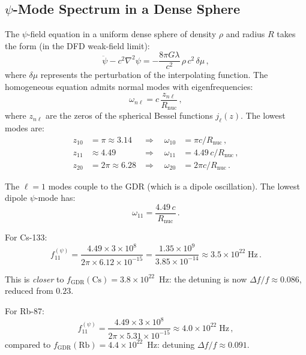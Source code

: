 \documentclass[aps,prd,twocolumn,superscriptaddress,nofootinbib]{revtex4-2}
\newcommand{\ee}[1]{\times 10^{#1}}
\newcommand{\mufunction}{\mu}
\newcommand{\lam}{\lambda}
\newcommand{\Rnuc}{R_{\mathrm{nuc}}}
\newcommand{\fGDR}{f_{\mathrm{GDR}}}
\begin{document}
\subsection{$\psi$-Mode Spectrum in a Dense Sphere}
\label{sec:psi-spectrum}

The $\psi$-field equation in a uniform dense sphere of density $\rho$
and radius $R$ takes the form (in the DFD weak-field limit):
\begin{equation}\label{eq:psi-wave}
\ddot\psi - c^2\nabla^2\psi = -\frac{8\pi G\lam}{c^2}\,\rho\,c^2\,
\delta\mufunction\,,
\end{equation}
where $\delta\mufunction$ represents the perturbation of the
interpolating function.  The homogeneous equation admits normal modes
with eigenfrequencies:
\begin{equation}\label{eq:psi-modes}
\omega_{n\ell} = c\,\frac{z_{n\ell}}{\Rnuc}\,,
\end{equation}
where $z_{n\ell}$ are the zeros of the spherical Bessel functions
$j_\ell(z)$.  The lowest modes are:
\begin{align}
z_{10} &= \pi \approx 3.14 & \Rightarrow\quad \omega_{10}
&= \pi c/\Rnuc\,,\\
z_{11} &\approx 4.49 & \Rightarrow\quad \omega_{11}
&= 4.49\,c/\Rnuc\,,\\
z_{20} &= 2\pi \approx 6.28 & \Rightarrow\quad \omega_{20}
&= 2\pi c/\Rnuc\,.
\end{align}

The $\ell = 1$ modes couple to the GDR (which is a dipole oscillation).
The lowest dipole $\psi$-mode has:
\begin{equation}
\omega_{11} = \frac{4.49\,c}{\Rnuc}\,.
\end{equation}

For Cs-133:
\begin{equation}
f_{11}^{(\psi)} = \frac{4.49 \times 3\ee{8}}{2\pi \times 6.12\ee{-15}}
= \frac{1.35\ee{9}}{3.85\ee{-14}} \approx 3.5\ee{22}\;\mathrm{Hz}\,.
\end{equation}

This is \emph{closer} to $\fGDR(\text{Cs}) = 3.8\ee{22}$~Hz:
the detuning is now $\Delta f/f \approx 0.086$, reduced from $0.23$.

For Rb-87:
\begin{equation}
f_{11}^{(\psi)} = \frac{4.49 \times 3\ee{8}}{2\pi \times 5.31\ee{-15}}
\approx 4.0\ee{22}\;\mathrm{Hz}\,,
\end{equation}
compared to $\fGDR(\text{Rb}) = 4.4\ee{22}$~Hz: detuning
$\Delta f/f \approx 0.091$.
\end{document}
